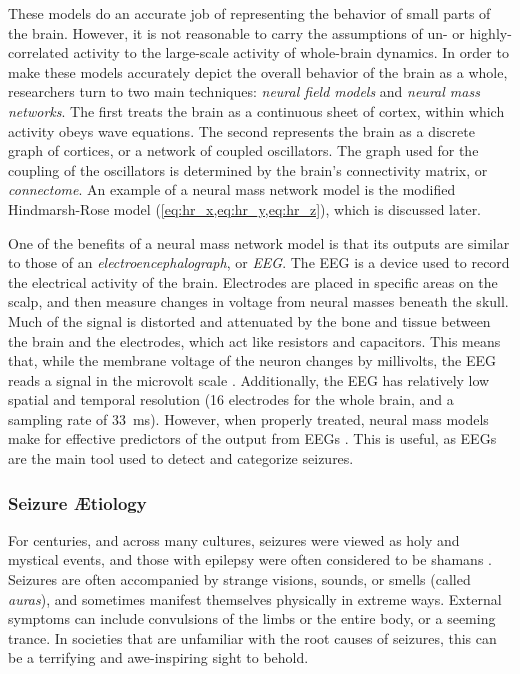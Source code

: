 These models do an accurate job of representing the behavior of small parts of the brain.
However, it is not reasonable to carry the assumptions of un- or highly-correlated activity to the large-scale activity of whole-brain dynamics.
In order to make these models accurately depict the overall behavior of the brain as a whole, researchers turn to two main techniques: \textit{neural field models} and \textit{neural mass networks}.
The first treats the brain as a continuous sheet of cortex, within which activity obeys wave equations.
The second represents the brain as a discrete graph of cortices, or a network of coupled oscillators.
The graph used for the coupling of the oscillators is determined by the brain's connectivity matrix, or \textit{connectome}.
An example of a neural mass network model is the modified Hindmarsh-Rose model (\cref{eq:hr_x,eq:hr_y,eq:hr_z}), which is discussed later.

One of the benefits of a neural mass network model is that its outputs are similar to those of an \textit{electroencephalograph}, or \textit{EEG}.
The EEG is a device used to record the electrical activity of the brain.
Electrodes are placed in specific areas on the scalp, and then measure changes in voltage from neural masses beneath the skull.
Much of the signal is distorted and attenuated by the bone and tissue between the brain and the electrodes, which act like resistors and capacitors.
This means that, while the membrane voltage of the neuron changes by millivolts, the EEG reads a signal in the microvolt scale \cite{Kandel2013}.
Additionally, the EEG has relatively low spatial and temporal resolution (16 electrodes for the whole brain, and a sampling rate of \SI{33}{\ms}).
However, when properly treated, neural mass models make for effective predictors of the output from EEGs \cite{Taylor2012,Leistritz2007}.
This is useful, as EEGs are the main tool used to detect and categorize seizures.

\subsubsection{Seizure \AE tiology}
\label{sec:intro_seizures_aetiology}
For centuries, and across many cultures, seizures were viewed as holy and mystical events, and those with epilepsy were often considered to be shamans \cite{Kandel2013,Fadiman1998}.
Seizures are often accompanied by strange visions, sounds, or smells (called \textit{auras}), and sometimes manifest themselves physically in extreme ways.
External symptoms can include convulsions of the limbs or the entire body, or a seeming trance.
In societies that are unfamiliar with the root causes of seizures, this can be a terrifying and awe-inspiring sight to behold.

